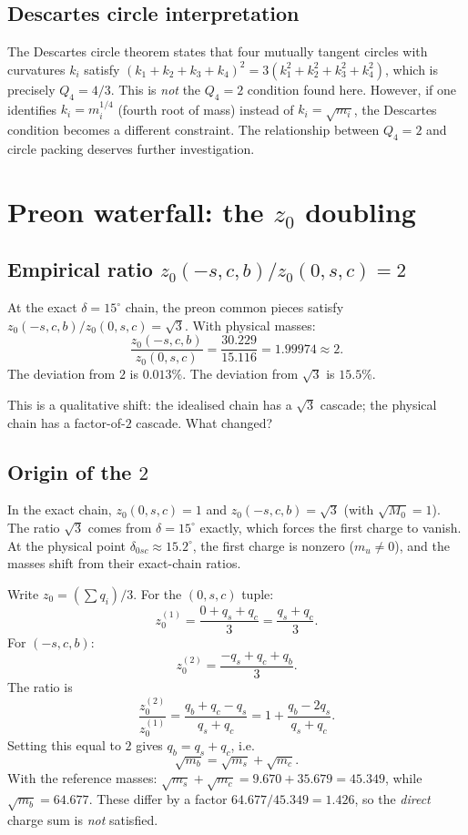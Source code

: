 \documentclass[11pt]{article}
\begin{document}
\subsection{Descartes circle interpretation}

The Descartes circle theorem states that four mutually tangent
circles with curvatures $k_i$ satisfy
$(k_1+k_2+k_3+k_4)^2 = 3(k_1^2+k_2^2+k_3^2+k_4^2)$,
which is precisely $Q_4 = 4/3$.  This is \emph{not} the
$Q_4=2$ condition found here.  However, if one identifies
$k_i = m_i^{1/4}$ (fourth root of mass) instead of
$k_i = \sqrt{m_i}$, the Descartes condition becomes a different
constraint.  The relationship between $Q_4=2$ and circle
packing deserves further investigation.

\section{Preon waterfall: the $z_0$ doubling}

\subsection{Empirical ratio $z_0(-s,c,b)/z_0(0,s,c) = 2$}

At the exact $\delta=15^\circ$ chain, the preon common pieces
satisfy $z_0(-s,c,b)/z_0(0,s,c) = \sqrt{3}$.  With physical
masses:
\begin{equation}
  \frac{z_0(-s,c,b)}{z_0(0,s,c)} = \frac{30.229}{15.116}
  = 1.99974 \approx 2.
  \label{eq:z0-ratio}
\end{equation}
The deviation from $2$ is $0.013\%$.  The deviation from
$\sqrt{3}$ is $15.5\%$.

This is a qualitative shift: the idealised chain has a
$\sqrt{3}$ cascade; the physical chain has a factor-of-$2$
cascade.  What changed?

\subsection{Origin of the $2$}

In the exact chain, $z_0(0,s,c)=1$ and $z_0(-s,c,b)=\sqrt{3}$
(with $\sqrt{M_0}=1$).  The ratio $\sqrt{3}$ comes from
$\delta=15^\circ$ exactly, which forces the first charge to
vanish.  At the physical point $\delta_{0sc}\approx 15.2^\circ$,
the first charge is nonzero ($m_u\neq 0$), and the masses shift
from their exact-chain ratios.

Write $z_0 = (\sum q_i)/3$.  For the $(0,s,c)$ tuple:
\[
  z_0^{(1)} = \frac{0 + q_s + q_c}{3}
  = \frac{q_s + q_c}{3}.
\]
For $(-s,c,b)$:
\[
  z_0^{(2)} = \frac{-q_s + q_c + q_b}{3}.
\]
The ratio is
\[
  \frac{z_0^{(2)}}{z_0^{(1)}}
  = \frac{q_b + q_c - q_s}{q_s + q_c}
  = 1 + \frac{q_b - 2q_s}{q_s + q_c}.
\]
Setting this equal to $2$ gives $q_b = q_s + q_c$, i.e.\
\begin{equation}
  \boxed{\sqrt{m_b} = \sqrt{m_s} + \sqrt{m_c}.}
  \label{eq:charge-sum}
\end{equation}
With the reference masses:
$\sqrt{m_s}+\sqrt{m_c} = 9.670 + 35.679 = 45.349$,
while $\sqrt{m_b} = 64.677$.  These differ by a factor
$64.677/45.349 = 1.426$, so the \emph{direct} charge sum is
\emph{not} satisfied.
\end{document}
